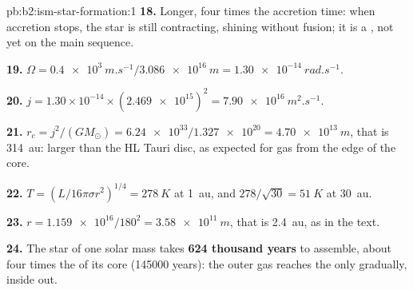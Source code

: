 \begin{solution}{pb:b2:ism-star-formation:1}
\textbf{18.} Longer, four times the accretion time: when accretion stops, the star is
still contracting, shining without fusion; it is a , not yet on the main
sequence.

\textbf{19.} $\Omega = \qty{0.4e3}{m.s^{-1}}/\qty{3.086e16}{m} = \qty{1.30e-14}{rad.s^{-1}}$.

\textbf{20.} $j = 1.30\times10^{-14}\times(\num{2.469e15})^2 = \qty{7.90e16}{m^2.s^{-1}}$.

\textbf{21.} $r_c = j^2/(GM_\odot) = \num{6.24e33}/\num{1.327e20} = \qty{4.70e13}{m}$, that
is \qty{314}{au}: larger than the HL Tauri disc, as expected for gas from the edge of the
core.

\textbf{22.} $T = (L/16\pi\sigma r^2)^{1/4} = \qty{278}{K}$ at \qty{1}{au}, and
$278/\sqrt{30} = \qty{51}{K}$ at \qty{30}{au}.

\textbf{23.} $r = \num{1.159e16}/180^2 = \qty{3.58e11}{m}$, that is \qty{2.4}{au}, as in the text.

\textbf{24.} The star of one solar mass takes
\textbf{\qty[text-series-to-math=true]{624}{} thousand years} to assemble, about four
times the  of its core (\num{145000} years): the outer gas reaches the
 only gradually, inside out.
\end{solution}

